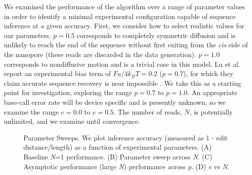 \documentclass{biophys_letter}
\begin{document}
We examined the performance of the algorithm over a range of parameter values in order to identify a minimal experimental configuration capable of sequence inference at a given accuracy.
First, we consider how to select realistic values for our parameters.
$p=0.5$ corresponds to completely symmetric diffusion and is unlikely to reach the end of the sequence without first exiting from the {\it cis} side of the nanopore (these reads are discarded in the data generation).
$p=1.0$ corresponds to nondiffusive motion and is a trivial case in this model.
Lu et al. report an experimental bias term of $Fa/4k_{B}T=0.2$ ($p=0.7$), for which they claim accurate sequence recovery is near impossible \cite{Lu:2011}.
We take this as a starting point for investigation, exploring the range $p=0.7$ to $p=1.0$.
An appropriate base-call error rate will be device specific and is presently unknown, so we examine the range $e=0.0$ to $e=0.5$.
The number of reads, $N$, is potentially unlimited, and we examine until convergence.

\begin{figure}
  \caption{Parameter Sweeps. We plot inference accuracy (measured as 1 - edit distance/length) as a function of experimental parameters. (A) Baseline \emph{N}=1 performance. (B) Parameter sweep across \emph{N}. (C) Asymptotic performance (large \emph{N}) performance across \emph{p}. (D) \emph{e} vs \emph{N}.}
\label{fig:parameter_sweeps}
\end{figure}
\end{document}
